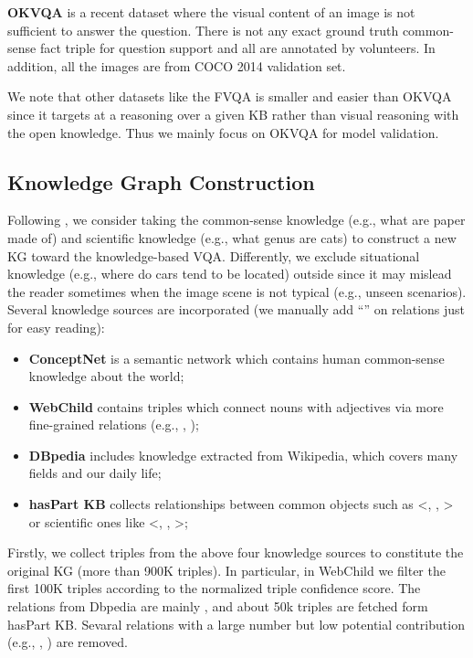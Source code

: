 \documentclass[sigconf]{acmart}
\newcommand{\cjy}[1]{{\color{black}#1}}
\begin{document}
\noindent\textbf{OKVQA}
\cite{DBLP:conf/cvpr/MarinoRFM19} is a recent dataset where the visual content of \cjy{an} image is not sufficient to answer the question. There is not any exact ground truth common-sense fact triple for question support and all  are annotated by volunteers. In addition, all the images are from COCO 2014 validation set.

We note that other datasets like the FVQA \cite{DBLP:journals/pami/WangWSDH18} is smaller and easier than OKVQA since it targets at a reasoning over a given KB rather than visual reasoning with the open knowledge. Thus we mainly focus on OKVQA for model validation.

\subsection{Knowledge Graph Construction} \label{sec:KGc}
Following \citep{DBLP:conf/cvpr/MarinoCP0R21}, we  consider taking the common-sense knowledge (e.g., what are paper made of) and scientiﬁc knowledge (e.g., what genus are cats) to construct a new KG toward the knowledge-based VQA.
Differently, we exclude situational knowledge (e.g., where do cars tend to be located) outside since it may mislead the reader sometimes when the image scene is not typical (e.g., unseen scenarios).
Several knowledge sources are incorporated (we manually add ``'' on relations just for easy reading): 
\begin{itemize}
\item\textbf{ConceptNet} \citep{DBLP:conf/aaai/SpeerCH17} is a semantic network which contains human common-sense knowledge about the world;

\item\textbf{WebChild} \citep{DBLP:conf/acl/TandonMW17} contains triples which connect nouns with adjectives via more fine-grained relations (e.g., , );

\item\textbf{DBpedia} \citep{DBLP:conf/semweb/AuerBKLCI07} \cjy{includes knowledge extracted from Wikipedia, which covers many fields and our daily life;}

\item\textbf{hasPart KB} \citep{DBLP:journals/corr/abs-2006-07510} collects  relationships between common objects such as <, , > or scientific ones like <, , >; 
\end{itemize}
Firstly, we collect triples from the above four knowledge sources to constitute the original KG (more than 900K triples). 
In particular, in  WebChild we filter the first 100K triples according to the normalized triple confidence score. The relations from Dbpedia are mainly , and about 50k  triples are fetched form hasPart KB. Sevaral relations with a large number  but low potential contribution (e.g., , ) are removed.
\end{document}
